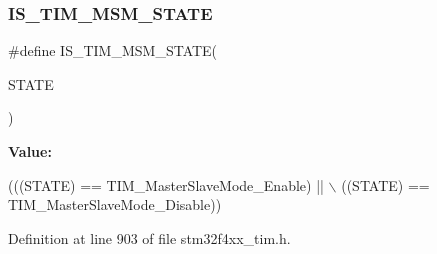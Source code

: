 \subsubsection{\texorpdfstring{I\+S\+\_\+\+T\+I\+M\+\_\+\+M\+S\+M\+\_\+\+S\+T\+A\+TE}{IS\_TIM\_MSM\_STATE}}
{\footnotesize\ttfamily \#define I\+S\+\_\+\+T\+I\+M\+\_\+\+M\+S\+M\+\_\+\+S\+T\+A\+TE(\begin{DoxyParamCaption}\item[{}]{S\+T\+A\+TE }\end{DoxyParamCaption})}

{\bfseries Value\+:}
\begin{DoxyCode}
(((STATE) == TIM\_MasterSlaveMode\_Enable) || \(\backslash\)
                                 ((STATE) == TIM\_MasterSlaveMode\_Disable))
\end{DoxyCode}


Definition at line 903 of file stm32f4xx\+\_\+tim.\+h.

